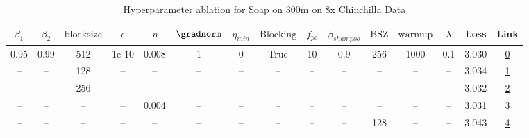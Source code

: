 \begin{table}[H]
\centering
\caption{Hyperparameter ablation for Soap on 300m on 8x Chinchilla Data}
\label{tab:ablation_soap_300m_on_8x_chinchilla_data}
\begin{tabular}{ccccccccccccccc}
\toprule
$\beta_1$ & $\beta_2$ & $\mathrm{block size}$ & $\epsilon$ & $\eta$ & $\gradnorm$ & $\eta_{min}$ & $\mathrm{Blocking}$ & $f_{pc}$ & $\beta_{shampoo}$ & $\mathrm{BSZ}$ & $\mathrm{warmup}$ & $\lambda$ & Loss & Link \\
\midrule
0.95 & 0.99 & 512 & 1e-10 & 0.008 & 1 & 0 & True & 10 & 0.9 & 256 & 1000 & 0.1 & 3.030 & \href{https://wandb.ai/stanford-mercury/optimizer-scaling/runs/sweep-300m-48B-soapeae57080lr0.008-wd0.1-minlr0-warmup1000-b10.9-f53d36}{0} \\
\midrule
-- & -- & 128 & -- & -- & -- & -- & -- & -- & -- & -- & -- & -- & 3.034 & \href{https://wandb.ai/stanford-mercury/optimizer-scaling/runs/sweep-300m-48B-soape98b16alr0.008-wd0.1-minlr0-warmup1000-b10.95-76e70a}{1} \\
-- & -- & 256 & -- & -- & -- & -- & -- & -- & -- & -- & -- & -- & 3.032 & \href{https://wandb.ai/stanford-mercury/optimizer-scaling/runs/sweep-300m-48B-soapec59568lr0.008-wd0.1-minlr0-warmup1000-b10.95-dc6b11}{2} \\
-- & -- & -- & -- & 0.004 & -- & -- & -- & -- & -- & -- & -- & -- & 3.031 & \href{https://wandb.ai/stanford-mercury/optimizer-scaling/runs/sweep-300m-48B-soape9f5a41lr0.004-wd0.1-minlr0-warmup1000-b10.95-c462c4}{3} \\
-- & -- & -- & -- & -- & -- & -- & -- & -- & -- & 128 & -- & -- & 3.043 & \href{https://wandb.ai/stanford-mercury/optimizer-scaling/runs/sweep-300m-48B-soapea631a39lr0.008-wd0.1-minlr0-warmup1000-b10.9-9b5fd4}{4} \\
\bottomrule
\end{tabular}
\end{table}

